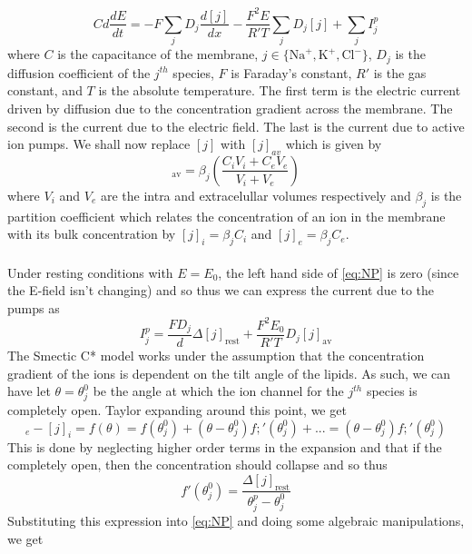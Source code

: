 \documentclass{article}
\newcommand{\od}[2]{\frac{d #1}{d #2}}
\numberwithin{equation}{section}
\begin{document}
\begin{equation}
    Cd\od{E}{t} = -F\sum_j D_j \od{[j]}{x} - \frac{F^2E}{R'T} \sum_jD_j[j] +\sum_jI^p_j \label{eq:NP}
\end{equation}
where $C$ is the capacitance of the membrane, $j\in \{\text{Na}^+, \text{K}^+, \text{Cl}^-\}$, $D_j$ is the diffusion coefficient of the $j^{th}$ species, $F$ is Faraday's constant, $R'$ is the gas constant, and $T$ is the absolute temperature. The first term is the electric current driven by diffusion due to the concentration gradient across the membrane. The second is the current due to the electric field. The last is the current due to active ion pumps. We shall now replace $[j]$ with $[j]_{av}$ which is given by 
\begin{equation}
    [j]_{\text{av}} = \beta_j \left( \frac{C_iV_i + C_eV_e}{V_i+V_e}\right)
\end{equation}
where $V_i$ and $V_e$ are the intra and extracelullar volumes respectively and $\beta_j$ is the partition coefficient which relates the concentration of an ion in the membrane with its bulk concentration by $[j]_i = \beta_jC_i$ and $[j]_e = \beta_jC_e$.\\\\
Under resting conditions with $E=E_0$, the left hand side of \eqref{eq:NP} is zero (since the E-field isn't changing) and so thus we can express the current due to the pumps as 
\begin{equation}
    I^p_j = \frac{FD_j}{d} \Delta [j]_{\text{rest}} + \frac{F^2E_0}{R'T}D_j [j]_{\text{av}}
\end{equation}
The Smectic C* model works under the assumption that the concentration gradient of the ions is dependent on the tilt angle of the lipids. As such, we can have let $\theta = \theta^0_j$ be the angle at which the ion channel for the $j^{th}$ species is completely open. Taylor expanding around this point, we get 
\begin{equation}
    [j]_e-[j]_i = f(\theta) = f(\theta^0_j) + (\theta - \theta^0_j)f;'(\theta^0_j) +... = (\theta - \theta^0_j)f;'(\theta^0_j)
\end{equation}
This is done by neglecting higher order terms in the expansion and that if the completely open, then the concentration should collapse and so thus 
\begin{equation}
    f'(\theta^0_j) = \frac{\Delta [j]_{\text{rest}}}{\theta^p_j - \theta^0_j}
\end{equation}
Substituting this expression into \eqref{eq:NP} and doing some algebraic manipulations, we get 
\end{document}
